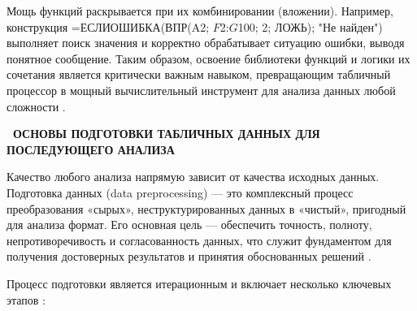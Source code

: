 \documentclass{SibFU-docs}
\begin{document}
Мощь функций раскрывается при их комбинировании (вложении). Например, конструкция =ЕСЛИОШИБКА(ВПР(A2; $F$2:$G$100; 2; ЛОЖЬ); "Не найден") выполняет поиск значения и корректно обрабатывает ситуацию ошибки, выводя понятное сообщение. Таким образом, освоение библиотеки функций и логики их сочетания является критически важным навыком, превращающим табличный процессор в мощный вычислительный инструмент для анализа данных любой сложности \cite{petrov2022, belenkiy2020}.


\newpage
{}
\begin{center}\textbf{\thesection\ ОСНОВЫ ПОДГОТОВКИ ТАБЛИЧНЫХ ДАННЫХ ДЛЯ ПОСЛЕДУЮЩЕГО АНАЛИЗА}\end{center}
\vspace*{-1.5em}


Качество любого анализа напрямую зависит от качества исходных данных. Подготовка данных (data preprocessing) --- это комплексный процесс преобразования «сырых», неструктурированных данных в «чистый», пригодный для анализа формат. Его основная цель --- обеспечить точность, полноту, непротиворечивость и согласованность данных, что служит фундаментом для получения достоверных результатов и принятия обоснованных решений \cite{mckinney2017python, anderson2015creating}.

Процесс подготовки является итерационным и включает несколько ключевых этапов \cite{exceljet2024clean, habr2021datacleaning}:
\end{document}
